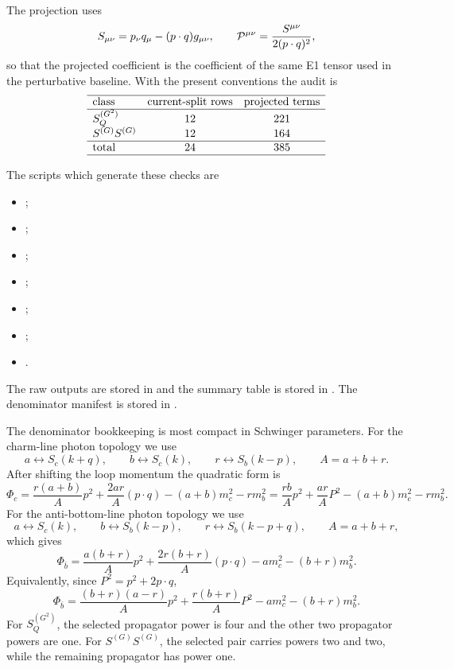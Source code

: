 \documentclass[11pt]{article}
\begin{document}
The projection uses
\[
S_{\mu\nu}=p_\nu q_\mu-(p\cdot q)g_{\mu\nu},\qquad
{\cal P}^{\mu\nu}=\frac{S^{\mu\nu}}{2(p\cdot q)^2},
\]
so that the projected coefficient is the coefficient of the same E1 tensor
used in the perturbative baseline.  With the present conventions the audit is
\[
\begin{array}{lcc}
\hline
\hbox{class} & \hbox{current-split rows} & \hbox{projected terms}\\
\hline
S_Q^{(G^2)} & 12 & 221\\
S^{(G)}S^{(G)} & 12 & 164\\
\hline
\hbox{total} & 24 & 385\\
\hline
\end{array}
\]

The scripts which generate these checks are
\begin{itemize}
  \item {};
  \item {};
  \item {};
  \item {};
  \item {};
  \item {};
  \item {}.
\end{itemize}
The raw outputs are stored in
 and the summary table is stored in
.  The denominator
manifest is stored in
.

The denominator bookkeeping is most compact in Schwinger parameters.  For the
charm-line photon topology we use
\[
a\leftrightarrow S_c(k+q),\qquad
b\leftrightarrow S_c(k),\qquad
r\leftrightarrow S_b(k-p),\qquad A=a+b+r .
\]
After shifting the loop momentum the quadratic form is
\[
\Phi_c=
\frac{r(a+b)}{A}p^2+\frac{2ar}{A}(p\cdot q)
-(a+b)m_c^2-rm_b^2
=
\frac{rb}{A}p^2+\frac{ar}{A}P^2-(a+b)m_c^2-rm_b^2 .
\]
For the anti-bottom-line photon topology we use
\[
a\leftrightarrow S_c(k),\qquad
b\leftrightarrow S_b(k-p),\qquad
r\leftrightarrow S_b(k-p+q),\qquad A=a+b+r ,
\]
which gives
\[
\Phi_{\bar b}=
\frac{a(b+r)}{A}p^2+\frac{2r(b+r)}{A}(p\cdot q)
-a m_c^2-(b+r)m_b^2 .
\]
Equivalently, since \(P^2=p^2+2p\cdot q\),
\[
\Phi_{\bar b}=
\frac{(b+r)(a-r)}{A}p^2+\frac{r(b+r)}{A}P^2
-a m_c^2-(b+r)m_b^2 .
\]
For \(S_Q^{(G^2)}\), the selected propagator power is four and the other two
propagator powers are one.  For \(S^{(G)}S^{(G)}\), the selected pair carries
powers two and two, while the remaining propagator has power one.
\end{document}
